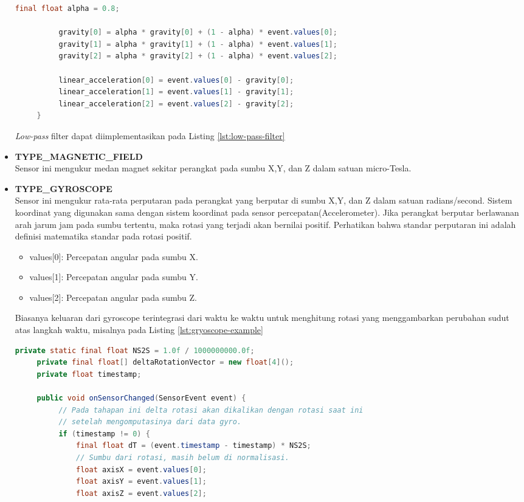 \begin{itemize}
\begin{lstlisting}[caption={Implementasi \textit{low-pass} filter},label={lst:low-pass-filter},language=java]
          final float alpha = 0.8;

          gravity[0] = alpha * gravity[0] + (1 - alpha) * event.values[0];
          gravity[1] = alpha * gravity[1] + (1 - alpha) * event.values[1];
          gravity[2] = alpha * gravity[2] + (1 - alpha) * event.values[2];

          linear_acceleration[0] = event.values[0] - gravity[0];
          linear_acceleration[1] = event.values[1] - gravity[1];
          linear_acceleration[2] = event.values[2] - gravity[2];
     }
\end{lstlisting}
\textit{Low-pass} filter dapat diimplementasikan pada Listing \ref{lst:low-pass-filter}\\
\item \textbf{TYPE\_MAGNETIC\_FIELD}\\
Sensor ini mengukur medan magnet sekitar perangkat pada sumbu X,Y, dan Z dalam satuan micro-Tesla.\\
\item \textbf{TYPE\_GYROSCOPE}\\
Sensor ini mengukur rata-rata perputaran pada perangkat yang berputar di sumbu X,Y, dan Z dalam satuan radians/second. Sistem koordinat yang digunakan sama dengan sistem koordinat pada sensor percepatan(Accelerometer). Jika perangkat berputar berlawanan arah jarum jam pada sumbu tertentu, maka rotasi yang terjadi akan bernilai positif. Perhatikan bahwa standar perputaran ini adalah definisi matematika standar pada rotasi positif.
\begin{itemize}
	\item values[0]: Percepatan angular pada sumbu X.
	\item values[1]: Percepatan angular pada sumbu Y.
	\item values[2]: Percepatan angular pada sumbu Z.
\end{itemize}
Biasanya keluaran dari gyroscope terintegrasi dari waktu ke waktu untuk menghitung rotasi yang menggambarkan perubahan sudut atas langkah waktu, misalnya pada Listing \ref{lst:gryoscope-example}
\begin{lstlisting}[caption=contoh implementasi gyroscope,label={lst:gryoscope-example},language=java]
	  private static final float NS2S = 1.0f / 1000000000.0f;
     private final float[] deltaRotationVector = new float[4]();
     private float timestamp;

     public void onSensorChanged(SensorEvent event) {
          // Pada tahapan ini delta rotasi akan dikalikan dengan rotasi saat ini
          // setelah mengomputasinya dari data gyro.
          if (timestamp != 0) {
              final float dT = (event.timestamp - timestamp) * NS2S;
              // Sumbu dari rotasi, masih belum di normalisasi.
              float axisX = event.values[0];
              float axisY = event.values[1];
              float axisZ = event.values[2];


\end{lstlisting}
\end{itemize}
